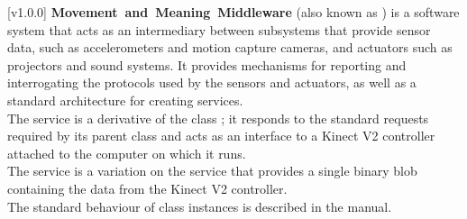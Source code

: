 [v1.0.0]
\textbf{Movement~and~Meaning~Middleware} (also known as \mplusm) is a software system
that acts as an intermediary between subsystems that provide sensor data, such as
accelerometers and motion capture cameras, and actuators such as projectors and sound
systems.
It provides mechanisms for reporting and interrogating the protocols used by the sensors
and actuators, as well as a standard architecture for creating services.\\

The \KVtwoI{} service is a derivative of the \mplusm{} class ;
it responds to the standard requests required by its parent class and acts as an interface
to a Kinect V2 controller attached to the computer on which it runs.\\

The \KVtwoBI{} service is a variation on the \KVtwoI{} service that provides a single
binary blob containing the data from the Kinect V2 controller.\\

The standard behaviour of  class instances is described in
the \emph{\MMM} manual.
\primaryEnd{}
